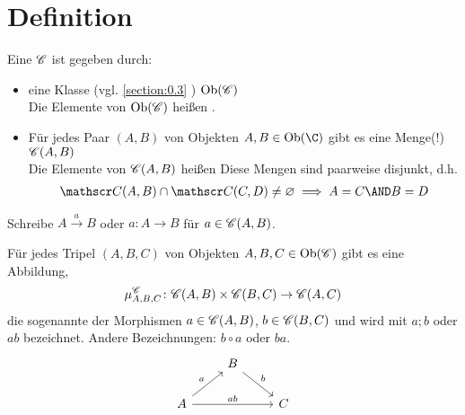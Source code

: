 \section{Definition}\label{section:1.2}
\begin{definition}
	Eine  $\mathscr C$ ist gegeben durch:
	\begin{itemize}
		\item eine Klasse (vgl. \ref{section:0.3}
		) $\operatorname{Ob}(\mathscr C)$\\
		Die Elemente von $\operatorname{Ob}(\mathscr C)$ heißen .
		\item Für jedes Paar $(A,B)$ von Objekten $A,B\in\Ob(\C)$ gibt es eine Menge(!) $\mathscr C(A,B)$\\
		Die Elemente von $\mathscr C(A,B)$ heißen  
		Diese Mengen sind paarweise disjunkt, d.h.
		\begin{align*}
			\Cat(A,B)\cap\Cat(C,D)\neq\emptyset
			\implies A=C\AND B=D
		\end{align*}
	\end{itemize}
\end{definition}

\begin{notation}
	Schreibe $A\overset{a}{\longrightarrow}B$ oder $a\colon A\to B$ für $a\in\mathscr C(A,B)$.
\end{notation}

\begin{lem}
	Für jedes Tripel $(A,B,C)$ von Objekten $A,B,C\in\operatorname{Ob}(\mathscr C)$ gibt es eine Abbildung, 
	\begin{align*}\index{Komposition}
		\mu_{A,B,C}^\Cat\colon\Cat(A,B)\times\Cat(B,C)\to\Cat(A,C)
	\end{align*}
	die sogenannte  der Morphismen $a\in\mathscr C(A,B)$, $b\in\mathscr C(B,C)$ und wird mit $a;b$ oder $ab$ bezeichnet.
	Andere Bezeichnungen: $b\circ a$ oder $ba$.
	$$
	\begin{tikzcd}
                                   & B \arrow[rd, "b"] &   \\
A \arrow[ru, "a"] \arrow[rr, "ab"] &                   & C
	\end{tikzcd}
	$$
\end{lem}

